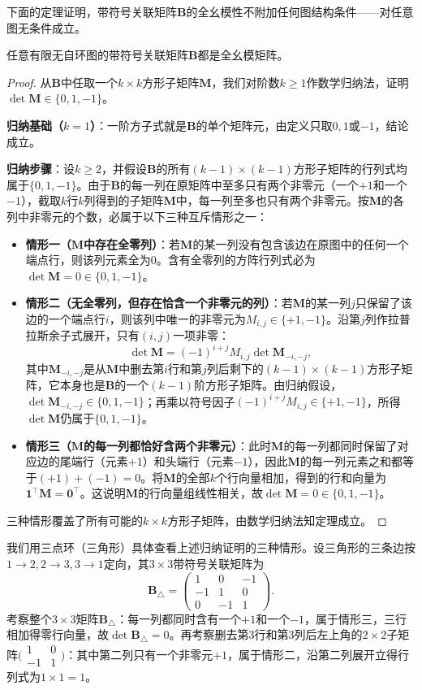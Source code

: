 下面的定理证明，带符号关联矩阵$\bm{B}$的全幺模性不附加任何图结构条件——对任意图无条件成立。

\begin{theorem}[带符号关联矩阵的全幺模性]
\label{thm:graph-signed-incidence-tu}
任意有限无自环图的带符号关联矩阵$\bm{B}$都是全幺模矩阵。
\end{theorem}

\begin{proof}
从$\bm{B}$中任取一个$k\times k$方形子矩阵$\bm{M}$，我们对阶数$k\geq 1$作数学归纳法，证明$\det\bm{M}\in\{0,1,-1\}$。

\textbf{归纳基础（$k=1$）}：一阶方子式就是$\bm{B}$的单个矩阵元，由定义只取$0,1$或$-1$，结论成立。

\textbf{归纳步骤}：设$k\geq 2$，并假设$\bm{B}$的所有$(k-1)\times(k-1)$方形子矩阵的行列式均属于$\{0,1,-1\}$。由于$\bm{B}$的每一列在原矩阵中至多只有两个非零元（一个$+1$和一个$-1$），截取$k$行$k$列得到的子矩阵$\bm{M}$中，每一列至多也只有两个非零元。按$\bm{M}$的各列中非零元的个数，必属于以下三种互斥情形之一：
\begin{itemize}
\item \textbf{情形一（$\bm{M}$中存在全零列）}：若$\bm{M}$的某一列没有包含该边在原图中的任何一个端点行，则该列元素全为$0$。含有全零列的方阵行列式必为$\det\bm{M}=0\in\{0,1,-1\}$。
\item \textbf{情形二（无全零列，但存在恰含一个非零元的列）}：若$\bm{M}$的某一列$j$只保留了该边的一个端点行$i$，则该列中唯一的非零元为$M_{i,j}\in\{+1,-1\}$。沿第$j$列作拉普拉斯余子式展开，只有$(i,j)$一项非零：
\[
\det\bm{M}=(-1)^{i+j}M_{i,j}\det\bm{M}_{-i,-j},
\]
其中$\bm{M}_{-i,-j}$是从$\bm{M}$中删去第$i$行和第$j$列后剩下的$(k-1)\times(k-1)$方形子矩阵，它本身也是$\bm{B}$的一个$(k-1)$阶方形子矩阵。由归纳假设，$\det\bm{M}_{-i,-j}\in\{0,1,-1\}$；再乘以符号因子$(-1)^{i+j}M_{i,j}\in\{+1,-1\}$，所得$\det\bm{M}$仍属于$\{0,1,-1\}$。
\item \textbf{情形三（$\bm{M}$的每一列都恰好含两个非零元）}：此时$\bm{M}$的每一列都同时保留了对应边的尾端行（元素$+1$）和头端行（元素$-1$），因此$\bm{M}$的每一列元素之和都等于$(+1)+(-1)=0$。将$\bm{M}$的全部$k$个行向量相加，得到的行和向量为$\bm{1}^\top\bm{M}=\bm{0}^\top$。这说明$\bm{M}$的行向量组线性相关，故$\det\bm{M}=0\in\{0,1,-1\}$。
\end{itemize}
三种情形覆盖了所有可能的$k\times k$方形子矩阵，由数学归纳法知定理成立。
\end{proof}

我们用三点环（三角形）具体查看上述归纳证明的三种情形。设三角形的三条边按$1\to2,2\to3,3\to1$定向，其$3\times 3$带符号关联矩阵为
\[
\bm{B}_\triangle=
\begin{pmatrix}
1&0&-1\\
-1&1&0\\
0&-1&1
\end{pmatrix}.
\]
考察整个$3\times 3$矩阵$\bm{B}_\triangle$：每一列都同时含有一个$+1$和一个$-1$，属于情形三，三行相加得零行向量，故$\det\bm{B}_\triangle=0$。再考察删去第$3$行和第$3$列后左上角的$2\times 2$子矩阵$\bigl(\begin{smallmatrix}1&0\\-1&1\end{smallmatrix}\bigr)$：其中第二列只有一个非零元$+1$，属于情形二，沿第二列展开立得行列式为$1\times 1=1$。

